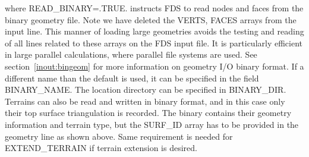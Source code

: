 \documentclass[12pt]{article}
\begin{document}
where {\ct READ\_BINARY=.TRUE.} instructs FDS to read nodes and faces from the binary geometry file.
Note we have deleted the {\ct VERTS, FACES} arrays from the input line.
This manner of loading large geometries avoids the testing and reading of all lines related to these arrays on the FDS input file.
It is particularly efficient in large parallel calculations, where parallel file systems are used. See section~\ref{inout:bingeom} for more information on geometry I/O binary format.
If a different name than the default is used, it can be specified in the field {\ct BINARY\_NAME}. The location directory can be specified in {\ct BINARY\_DIR}.
Terrains can also be read and written in binary format, and in this case only their top surface triangulation is recorded. The binary contains their geometry information and terrain type, but the  {\ct SURF\_ID} array has to be provided in the geometry line as shown above. Same requirement is needed for {\ct EXTEND\_TERRAIN} if terrain extension is desired. 


%
%
%
%
%
%
%
%
\end{document}
